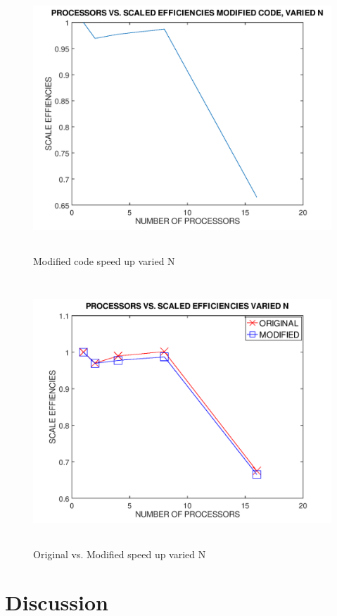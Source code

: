 \documentclass[12pt]{article}
\begin{document}
	\begin{figure}[H]
		\hfill\includegraphics[width=150mm,height= 100mm]{varied_mod.png}\hspace*{\fill}
		\caption{Modified code speed up varied N }
	\end{figure}


	\begin{figure}[H]
		\hfill\includegraphics[width=150mm,height= 100mm]{varied_combine.png}\hspace*{\fill}
		\caption{Original vs. Modified speed up varied N }
	\end{figure}

	\section{Discussion}
\end{document}
